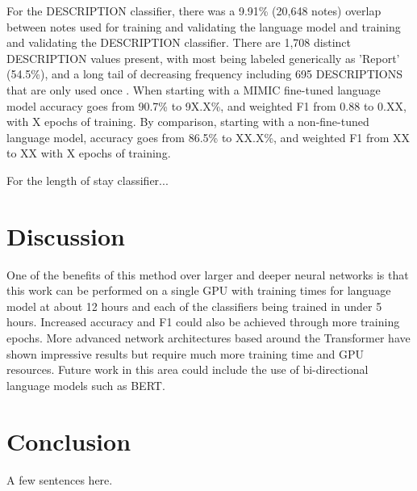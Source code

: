 \documentclass{amia}
\begin{document}
For the DESCRIPTION classifier, there was a 9.91\% (20,648 notes) overlap between notes used for training and validating the language model and training and validating the DESCRIPTION classifier. There are 1,708 distinct DESCRIPTION values present, with most being labeled generically as 'Report' (54.5\%), and a long tail of decreasing frequency including 695 DESCRIPTIONS that are only used once . When starting with a MIMIC fine-tuned language model accuracy goes from 90.7\% to 9X.X\%, and weighted F1 from 0.88 to 0.XX, with X epochs of training. By comparison, starting with a non-fine-tuned language model, accuracy goes from 86.5\% to XX.X\%, and weighted F1 from XX to XX with X epochs of training.

For the length of stay classifier...

\section*{Discussion}

One of the benefits of this method over larger and deeper neural networks is that this work can be performed on a single GPU with training times for language model at about 12 hours and each of the classifiers being trained in under 5 hours. Increased accuracy and F1 could also be achieved through more training epochs. More advanced network architectures based around the Transformer\cite{vaswani_attention_2017} have shown impressive results but require much more training time and GPU resources. Future work in this area could include the use of bi-directional language models such as BERT\cite{Devlin2018Oct}.

\section*{Conclusion}

A few sentences here.



\end{document}
